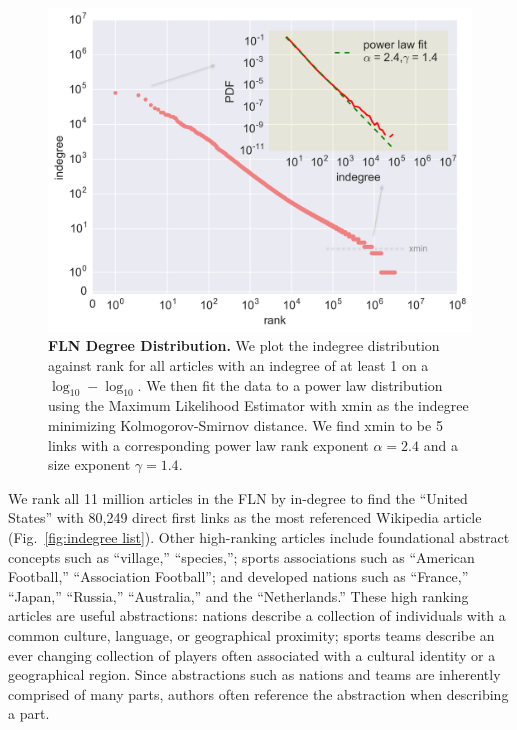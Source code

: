 \documentclass[pre,twocolumn,twoside,superscriptaddress,floatfix, aps, 10pt]{revtex4-1}
\begin{document}
\begin{figure}[tp!]
  \includegraphics[width=\columnwidth]{graphics/ndegree_loglog.png}
  \caption{
    \textbf{FLN Degree Distribution.}
    We plot the indegree distribution against rank for all articles with an indegree of at least 1 on a $\log_{10}-\log_{10}$. We then fit the data to a power law 
    distribution using the Maximum Likelihood Estimator with xmin as the indegree minimizing Kolmogorov-Smirnov distance. We find xmin to be 5 links with a corresponding power law rank exponent $\alpha = 2.4$ and a size exponent $\gamma = 1.4$.
}
  \label{fig:degree distribution}
\end{figure}

We rank all 11 million articles in the FLN by in-degree to find 
the ``United States'' with 80,249 direct first links as the most referenced
Wikipedia article 
(Fig.~\ref{fig:indegree list}). 
Other high-ranking articles
include foundational abstract concepts such as ``village,'' ``species,''; 
sports associations such as ``American Football,'' ``Association Football''; 
and developed nations such as ``France,'' ``Japan,'' ``Russia,'' ``Australia,'' and 
the ``Netherlands.'' These high ranking articles are useful abstractions: nations
describe a collection of individuals with a common culture, language, or 
geographical proximity; sports teams describe an ever changing collection of 
players often associated with a cultural identity or a geographical 
region. 
Since abstractions such as nations and teams are inherently comprised
of many parts, authors often reference the abstraction when describing a part.
\end{document}
